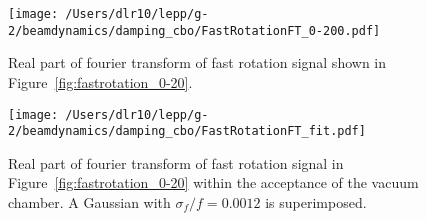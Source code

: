 \documentclass[10pt]{article}
\begin{document}
\begin{figure}[htbp] %
\begin{minipage}[t]{0.48\textwidth}
   \centering
   \texttt{[image: /Users/dlr10/lepp/g-2/beamdynamics/damping\_cbo/FastRotationFT\_0-200.pdf]} 
   \caption{Real part of fourier transform of fast rotation signal shown in Figure~\ref{fig:fastrotation_0-20}. \label{fig:fastrotationft_0-200}}
 \end{minipage}
\hfill
\begin{minipage}[t]{0.48\textwidth}
\centering
   \texttt{[image: /Users/dlr10/lepp/g-2/beamdynamics/damping\_cbo/FastRotationFT\_fit.pdf]} 
\caption{Real part of fourier transform of fast rotation signal in Figure~\ref{fig:fastrotation_0-20} within the acceptance of the vacuum chamber. A Gaussian with
$\sigma_f/f = 0.0012$ is superimposed.
   \label{fig:fastrotationft_fit}}
\end{minipage}
\end{figure}
\end{document}
